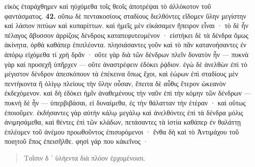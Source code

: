 \documentclass[a4paper, 11pt, oneside, polutonikogreek, german]{article}
\begin{document}
εἰκὸς ἐταράχθημεν καὶ ηὐχόμεθα τοῖς θεοῖς ἀποτρέψαι τὸ ἀλλόκοτον τοῦ φαντάσματος. \textbf{42.} οὔπω δὲ πεντακοσίους σταδίους διελθόντες εἴδομεν ὕλην μεγίστην καὶ λάσιον πιτύων καὶ κυπαρίττων. καὶ ἡμεῖς μὲν εἰκάσαμεν ἤπειρον εἶναι · τὸ δὲ ἦν πέλαγος ἄβυσσον ἀρρίζοις δένδροις καταπεφυτευμένον · εἱστήκει δὲ τὰ δένδρα ὅμως ἀκίνητα, ὀρθὰ καθάπερ ἐπιπλέοντα. πλησιάσαντες γοῦν καὶ τὸ πᾶν κατανοήσαντες ἐν ἀπόρῳ εἰχόμεθα τί χρὴ δρᾶν · οὔτε γὰρ διὰ τῶν δένδρων πλεῖν δυνατὸν ἦν --- πυκνὰ γὰρ καὶ προσεχῆ ὑπῆρχεν --- οὔτε ἀναστρέφειν ἐδόκει ῥᾴδιον. ἐγὼ δὲ ἀνελθὼν ἐπὶ τὸ μέγιστον δένδρον ἀπεσκόπουν τὰ ἐπέκεινα ὅπως ἔχοι, καὶ ἑώρων ἐπὶ σταδίους μὲν πεντήκοντα ἢ ὀλίγῳ πλείους τὴν ὕλην οὖσαν, ἔπειτα δὲ αὖθις ἕτερον ὠκεανὸν ἐκδεχόμενον. καὶ δὴ ἐδόκει ἡμῖν ἀναθεμένους τὴν ναῦν ἐπὶ τὴν κόμην τῶν δένδρων --- πυκνὴ δὲ ἦν --- ὑπερβιβάσαι, εἰ δυναίμεθα, ἐς τὴν θάλατταν τὴν ἑτέραν · καὶ οὕτως ἐποιοῦμεν. ἐκδήσαντες γὰρ αὐτὴν κάλῳ μεγάλῳ καὶ ἀνελθόντες ἐπὶ τὰ δένδρα μόλις ἀνιμησάμεθα, καὶ θέντες ἐπὶ τῶν κλάδων, πετάσαντες τὰ ἱστία καθάπερ ἐν θαλάττῃ ἐπλέομεν τοῦ ἀνέμου προωθοῦντος ἐπισυρόμενοι · ἔνθα δὴ καὶ τὸ Ἀντιμάχου τοῦ ποιητοῦ ἔπος ἐπεισῆλθε. φησὶ γάρ που κἀκεῖνος ·
\begin{quotation}
Τοῖσιν δ ᾽ ὑλήεντα διὰ πλόον ἐρχομένοισι.
\end{quotation}
\end{document}
